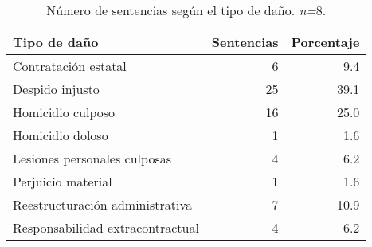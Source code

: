 \begin{table}[!htbp]
\centering
\caption{Número de sentencias según el tipo de daño. \textit{n=}8.} 
\label{tab:dano}
\begin{tabular}{lrr}
  \hline
Tipo de daño & Sentencias & Porcentaje \\ 
  \hline
Contratación estatal &  6 & 9.4 \\ 
  Despido injusto & 25 & 39.1 \\ 
  Homicidio culposo & 16 & 25.0 \\ 
  Homicidio doloso &  1 & 1.6 \\ 
  Lesiones personales culposas &  4 & 6.2 \\ 
  Perjuicio material &  1 & 1.6 \\ 
  Reestructuración administrativa &  7 & 10.9 \\ 
  Responsabilidad extracontractual &  4 & 6.2 \\ 
   \hline
\end{tabular}
\end{table}
